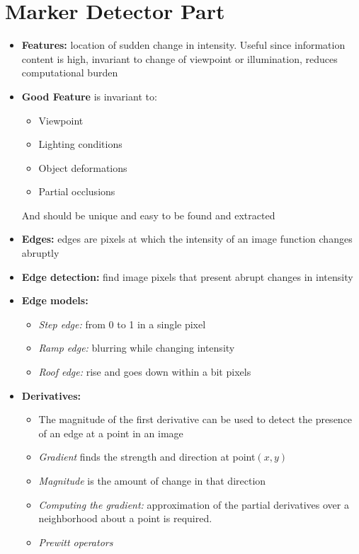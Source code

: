 \documentclass{article}
\begin{document}
\section{Marker Detector Part}
\begin{itemize}
    \item \textbf{Features:} location of sudden change in intensity. Useful since information content is high, invariant to change of viewpoint or illumination, reduces computational burden
    \item \textbf{Good Feature} is invariant to:
    \begin{itemize}
        \item Viewpoint
        \item Lighting conditions
        \item Object deformations
        \item Partial occlusions
    \end{itemize}
    And should be unique and easy to be found and extracted
    \item \textbf{Edges:} edges are pixels at which the intensity of an image function changes abruptly
    \item \textbf{Edge detection:} find image pixels that present abrupt changes in intensity
    \item \textbf{Edge models:}
    \begin{itemize}
        \item \textit{Step edge:} from 0 to 1 in a single pixel
        \item \textit{Ramp edge:} blurring while changing intensity
        \item \textit{Roof edge:} rise and goes down within a bit pixels 
    \end{itemize}
    \item \textbf{Derivatives:}
    \begin{itemize}
        \item The magnitude of the first derivative can be used to detect the presence of an edge at a point in an image
        \item \textit{Gradient} finds the strength and direction at point\((x,y)\)
        \item \textit{Magnitude} is the amount of change in that direction
        \item \textit{Computing the gradient:} approximation of the partial derivatives over a neighborhood about a point is required. 
        \item \textit{Prewitt operators}

\end{itemize}
\end{itemize}
\end{document}
